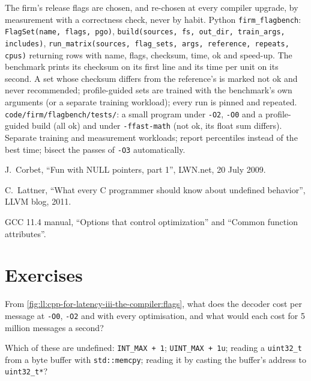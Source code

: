 \begin{build}
 The firm's release flags are chosen, and re-chosen at every compiler upgrade, by measurement with a
correctness check, never by habit.
 Python \texttt{firm\_flagbench}: \texttt{FlagSet(name, flags, pgo)}, \texttt{build(sources, fs,
out\_dir, train\_args, includes)}, \texttt{run\_matrix(sources, flag\_sets, args, reference, repeats, cpus)} returning
rows with name, flags, checksum, time, ok and speed-up. The benchmark prints its checksum on its first line and its time
per unit on its second.
 A set whose checksum differs from the reference's is marked not ok and never recommended; profile-guided
sets are trained with the benchmark's own arguments (or a separate training workload); every run is pinned and repeated.
 \texttt{code/firm/flagbench/tests/}: a small program under \texttt{-O2}, \texttt{-O0} and a
profile-guided build (all ok) and under \texttt{-ffast-math} (not ok, its float sum differs).
 Separate training and measurement workloads; report percentiles instead of the best time; bisect the
passes of \texttt{-O3} automatically.
\end{build}

\begin{omsources}
\item J.~Corbet, ``Fun with NULL pointers, part 1'', LWN.net, 20 July 2009.
\item C.~Lattner, ``What every C programmer should know about undefined behavior'', LLVM blog, 2011.
\item GCC 11.4 manual, ``Options that control optimization'' and ``Common function attributes''.
\end{omsources}

\section{Exercises}

\begin{exercise}[$\star$]\label{exo:ll:cpp-for-latency-iii-the-compiler:1}
From \cref{fig:ll:cpp-for-latency-iii-the-compiler:flags}, what does the decoder cost per message at \texttt{-O0},
\texttt{-O2} and with every optimisation, and what would each cost for 5 million messages a second?
\end{exercise}

\begin{exercise}[$\star$]\label{exo:ll:cpp-for-latency-iii-the-compiler:2}
Which of these are undefined: \texttt{INT\_MAX + 1}; \texttt{UINT\_MAX + 1u}; reading a \texttt{uint32\_t} from a byte
buffer with \texttt{std::memcpy}; reading it by casting the buffer's address to \texttt{uint32\_t*}?
\end{exercise}

